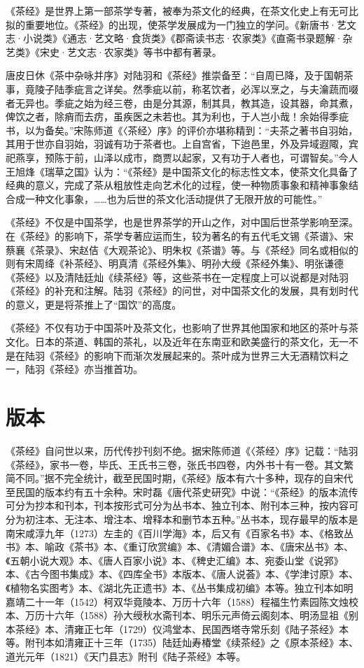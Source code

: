 \documentclass[12pt,UTF8]{ctexbook}
\begin{document}
《茶经》是世界上第一部茶学专著，被奉为茶文化的经典，在茶文化史上有无可比拟的重要地位。《茶经》的出现，使茶学发展成为一门独立的学问。《新唐书·艺文志·小说类》《通志·艺文略·食货类》《郡斋读书志·农家类》《直斋书录题解·杂艺类》《宋史·艺文志·农家类》等书中都有著录。

唐皮日休《茶中杂咏并序》对陆羽和《茶经》推崇备至：“自周已降，及于国朝茶事，竟陵子陆季疵言之详矣。然季疵以前，称茗饮者，必浑以烹之，与夫瀹蔬而啜者无异也。季疵之始为经三卷，由是分其源，制其具，教其造，设其器，命其煮，俾饮之者，除痟而去疠，虽疾医之未若也。其为利也，于人岂小哉！余始得季疵书，以为备矣。”宋陈师道《〈茶经〉序》的评价亦堪称精到：“夫茶之著书自羽始，其用于世亦自羽始，羽诚有功于茶者也。上自宫省，下迨邑里，外及异域遐陬，宾祀燕享，预陈于前，山泽以成市，商贾以起家，又有功于人者也，可谓智矣。”今人王旭烽《瑞草之国》认为：“《茶经》是中国茶文化的标志性文本，使茶文化具备了经典的意义，完成了茶从粗放性走向艺术化的过程，使一种物质事象和精神事象结合成一种文化事象，……也为后世的茶文化活动提供了无限开放的可能性。”

《茶经》不仅是中国茶学，也是世界茶学的开山之作，对中国后世茶学影响至深。在《茶经》的影响下，茶学专著应运而生，较为著名的有五代毛文锡《茶谱》、宋蔡襄《茶录》、宋赵佶《大观茶论》、明朱权《茶谱》等。与《茶经》同名或相似的则有宋周绛《补茶经》、明真清《茶经外集》、明孙大绶《茶经外集》、明张谦德《茶经》以及清陆廷灿《续茶经》等，这些茶书在一定程度上可以说都是对陆羽《茶经》的补充和注解。陆羽《茶经》的问世，对中国茶文化的发展，具有划时代的意义，更是将茶推上了“国饮”的高度。

《茶经》不仅有功于中国茶叶及茶文化，也影响了世界其他国家和地区的茶叶与茶文化。日本的茶道、韩国的茶礼，以及近年在东南亚和欧美盛行的茶文化，无一不是在陆羽《茶经》的影响下而渐次发展起来的。茶叶成为世界三大无酒精饮料之一，陆羽《茶经》亦当推首功。

\section{版本}

《茶经》自问世以来，历代传抄刊刻不绝。据宋陈师道《〈茶经〉序》记载：“陆羽《茶经》，家书一卷，毕氏、王氏书三卷，张氏书四卷，内外书十有一卷。其文繁简不同。”据不完全统计，截至民国时期，《茶经》版本有六十多种，现存的自宋代至民国的版本约有五十余种。宋时磊《唐代茶史研究》中说：“《茶经》的版本流传可分为抄本和刊本，刊本按形式可分为丛书本、独立刊本、附刊本三种，按内容可分为初注本、无注本、增注本、增释本和删节本五种。”丛书本，现存最早的版本是南宋咸淳九年（1273）左圭的《百川学海》本，后又有《百家名书》本、《格致丛书》本、喻政《茶书》本、《重订欣赏编》本、《清媚合谱》本、《唐宋丛书》本、《五朝小说大观》本、《唐人百家小说》本、《稗史汇编》本、宛委山堂《说郛》本、《古今图书集成》本、《四库全书》本版本、《唐人说荟》本、《学津讨原》本、《植物名实图考》本、《湖北先正遗书》本、《丛书集成初编》本等。独立刊本如明嘉靖二十一年（1542）柯双华竟陵本、万历十六年（1588）程福生竹素园陈文烛校本、万历十六年（1588）孙大绶秋水斋刊本、明乐元声倚云阁刻本、明汤显祖《别本茶经》本、清雍正七年（1729）仪鸿堂本、民国西塔寺常乐刻《陆子茶经》本等。附刊本如清雍正十三年（1735）陆廷灿寿椿堂《续茶经》之《原本茶经》本、道光元年（1821）《天门县志》附刊《陆子茶经》本等。
\end{document}
